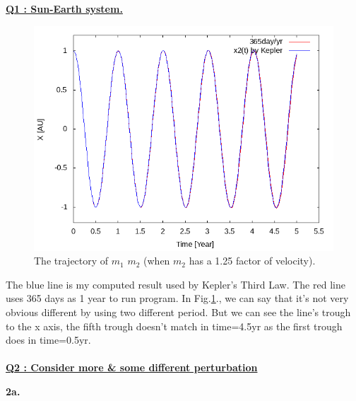 \documentclass{article}
\begin{document}
\underline{\textbf{Q1 : Sun-Earth system.\\}}
\begin{figure}[h]
    \centering 
	\includegraphics[scale=0.45]{pro1_x2.png}
	\caption{The trajectory of $m_1$ $m_2$ (when $m_2$ has a 1.25 factor of velocity).} %
	\label{fig.pro1} %
\end{figure}

The blue line is my computed result used by Kepler's Third Law.
The red line uses 365 days as 1 year to run program.
In Fig.\ref{fig.pro1}., we can say that it's not very obvious different by using two different period.
But we can see the line's trough to the x axis, the fifth trough doesn't match in time=4.5yr as the first trough does in time=0.5yr.\\ \\
\underline{\textbf{Q2 : Consider more \& some different perturbation}}

\textbf{2a.}
\end{document}
